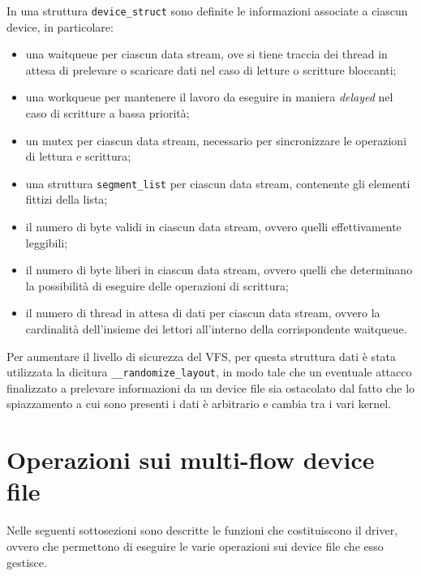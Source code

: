 \documentclass{article}
\begin{document}
In una struttura \texttt{device\_struct} sono definite le informazioni associate a ciascun device, in particolare:
\begin{itemize}
\item una waitqueue per ciascun data stream, ove si tiene traccia dei thread in attesa di prelevare o scaricare dati nel caso di letture o scritture bloccanti;
\item una workqueue per mantenere il lavoro da eseguire in maniera \textsl{delayed} nel caso di scritture a bassa priorità;
\item un mutex per ciascun data stream, necessario per sincronizzare le operazioni di lettura e scrittura;
\item una struttura \texttt{segment\_list} per ciascun data stream, contenente gli elementi fittizi della lista;
\item il numero di byte validi in ciascun data stream, ovvero quelli effettivamente leggibili;
\item il numero di byte liberi in ciascun data stream, ovvero quelli che determinano la possibilità di eseguire delle operazioni di scrittura;
\item il numero di thread in attesa di dati per ciascun data stream, ovvero la cardinalità dell'insieme dei lettori all'interno della corrispondente waitqueue.
\end{itemize}
Per aumentare il livello di sicurezza del VFS, per questa struttura dati è stata utilizzata la dicitura \texttt{\_\_randomize\_layout}, in modo tale che un eventuale attacco finalizzato a prelevare informazioni da un device file sia ostacolato dal fatto che lo spiazzamento a cui sono presenti i dati è arbitrario e cambia tra i vari kernel.

\section{Operazioni sui multi-flow device file}
Nelle seguenti sottosezioni sono descritte le funzioni che costituiscono il driver, ovvero che permettono di eseguire le varie operazioni sui device file che esso gestisce.
\end{document}
